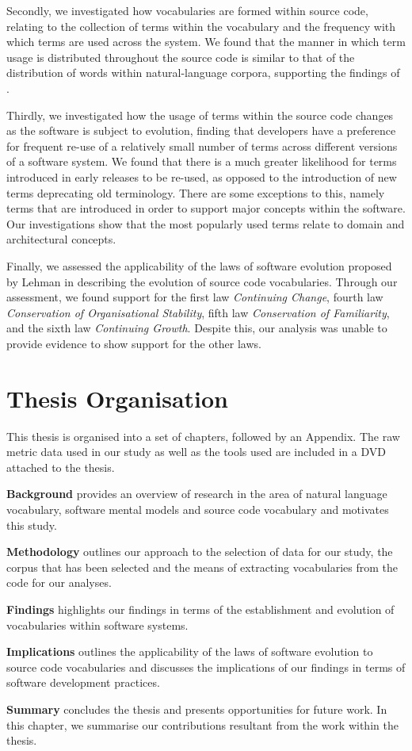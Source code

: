 Secondly, we investigated how vocabularies are formed within source code, relating to the collection of terms within the vocabulary and the frequency with which terms are used across the system. We found that the manner in which term usage is distributed throughout the source code is similar to that of the distribution of words within natural-language corpora, supporting the findings of \cite{Pierret09a}.

Thirdly, we investigated how the usage of terms within the source code changes as the software is subject to evolution, finding that developers have a preference for frequent re-use of a relatively small number of terms across different versions of a software system. We found that there is a much greater likelihood for terms introduced in early releases to be re-used, as opposed to the introduction of new terms deprecating old terminology. There are some exceptions to this, namely terms that are introduced in order to support major concepts within the software. Our investigations show that the most popularly used terms relate to domain and architectural concepts.

Finally, we assessed the applicability of the laws of software evolution proposed by Lehman \cite{Lehman80a,Lehman97a} in describing the evolution of source code vocabularies. Through our assessment, we found support for the first law \emph{Continuing Change}, fourth law \emph{Conservation of Organisational Stability}, fifth law \emph{Conservation of Familiarity}, and the sixth law \emph{Continuing Growth}. Despite this, our analysis was unable to provide evidence to show support for the other laws.


\section{Thesis Organisation} %
\label{sec:thesis_organisation}

This thesis is organised into a set of chapters, followed by an Appendix. The raw metric data used in our study as well as the tools used are included in a DVD attached to the thesis.

\textbf{Background} provides an overview of research in the area of natural language vocabulary, software mental models and source code vocabulary and motivates this study.

\textbf{Methodology} outlines our approach to the selection of data for our study, the corpus that has been selected and the means of extracting vocabularies from the code for our analyses.

\textbf{Findings} highlights our findings in terms of the establishment and evolution of vocabularies within software systems.

\textbf{Implications} outlines the applicability of the laws of software evolution to source code vocabularies and discusses the implications of our findings in terms of software development practices.

\textbf{Summary} concludes the thesis and presents opportunities for future work. In this chapter, we summarise our contributions resultant from the work within the thesis.


